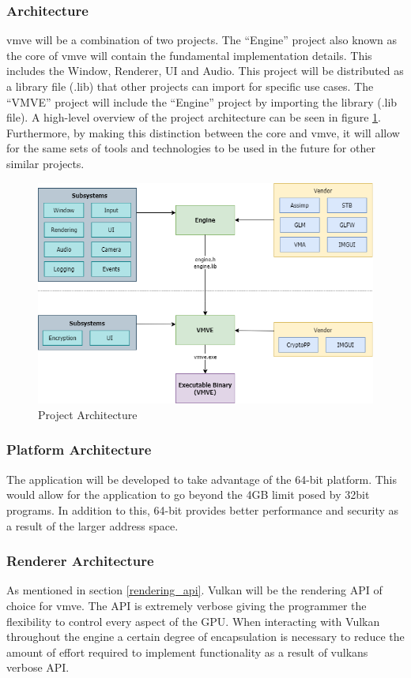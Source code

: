 \documentclass[11pt]{article}
\begin{document}
\subsubsection{Architecture}
\gls*{vmve} will be a combination of two projects. The ``Engine'' project also
known as the core of \gls*{vmve} will contain the fundamental implementation
details. This includes the Window, Renderer, UI and Audio. This project will be
distributed as a library file (.lib) that other projects can import for specific
use cases. The ``VMVE'' project will include the ``Engine'' project by importing
the library (.lib file). A high-level overview of the project architecture can
be seen in figure \ref{fig:projarch}. Furthermore, by making this distinction
between the core and \gls*{vmve}, it will allow for the same sets of tools and
technologies to be used in the future for other similar projects.

\begin{figure}[H]
  \centering
  \includegraphics[width=\textwidth]{images/project_architecture.png}
  \caption{Project Architecture}
  \label{fig:projarch}
\end{figure}

\subsubsection{Platform Architecture}
The application will be developed to take advantage of the 64-bit platform. This
would allow for the application to go beyond the 4GB limit posed by 32bit
programs. In addition to this, 64-bit provides better performance and security
as a result of the larger address space.

\subsubsection{Renderer Architecture} \label{renderer_architecture}
As mentioned in section \ref{rendering_api}. Vulkan will be the rendering API of
choice for \gls*{vmve}. The API is extremely verbose giving the programmer the
flexibility to control every aspect of the GPU. When interacting with Vulkan
throughout the engine a certain degree of encapsulation is necessary to reduce
the amount of effort required to implement functionality as a result of
\glspl*{vulkan} verbose API.
\end{document}
